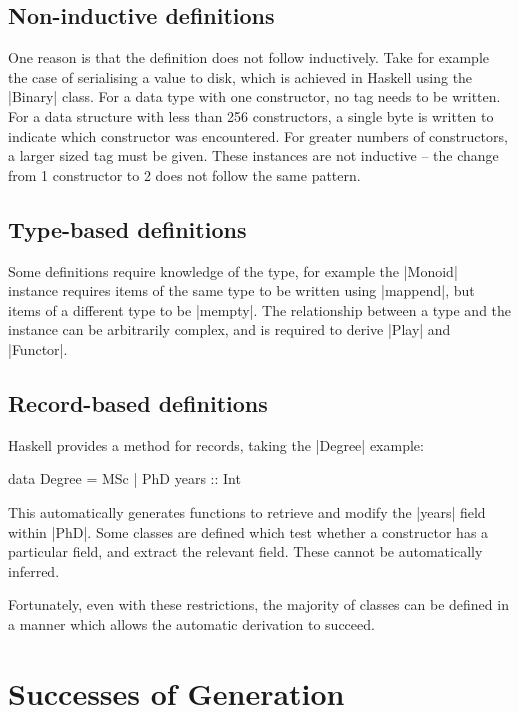 \documentclass{llncs}
\begin{document}
\subsection{Non-inductive definitions}

One reason is that the definition does not follow inductively. Take for example the case of serialising a value to disk, which is achieved in Haskell using the |Binary| class. For a data type with one constructor, no tag needs to be written. For a data structure with less than 256 constructors, a single byte is written to indicate which constructor was encountered. For greater numbers of constructors, a larger sized tag must be given. These instances are not inductive -- the change from 1 constructor to 2 does not follow the same pattern.

\subsection{Type-based definitions}

Some definitions require knowledge of the type, for example the |Monoid| instance requires items of the same type to be written using |mappend|, but items of a different type to be |mempty|. The relationship between a type and the instance can be arbitrarily complex, and is required to derive |Play| and |Functor|.

\subsection{Record-based definitions}

Haskell provides a method for records, taking the |Degree| example:

\begin{code}
data Degree = MSc | PhD {years :: Int}
\end{code}

This automatically generates functions to retrieve and modify the |years| field within |PhD|. Some classes are defined which test whether a constructor has a particular field, and extract the relevant field. These cannot be automatically inferred.

Fortunately, even with these restrictions, the majority of classes can be defined in a manner which allows the automatic derivation to succeed.

\section{Successes of Generation}
\end{document}
